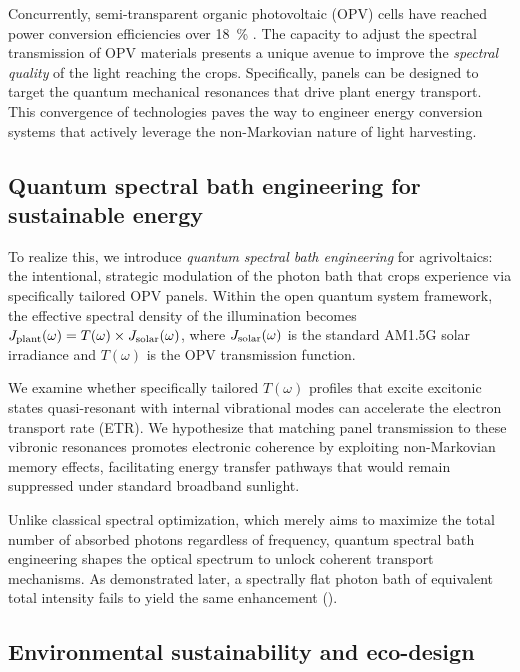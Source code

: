 Concurrently, semi-transparent organic photovoltaic (OPV) cells have reached power conversion efficiencies over \SI{18}{\percent} \cite{Lunt2011, Tong2016, Firdaus2019, Li2020, Cui2021, Wu2024}. The capacity to adjust the spectral transmission of OPV materials presents a unique avenue to improve the \textit{spectral quality} of the light reaching the crops. Specifically, panels can be designed to target the quantum mechanical resonances that drive plant energy transport. This convergence of technologies paves the way to engineer energy conversion systems that actively leverage the non-Markovian nature of light harvesting.

\subsection{Quantum spectral bath engineering for sustainable energy}

To realize this, we introduce \textit{quantum spectral bath engineering} for agrivoltaics: the intentional, strategic modulation of the photon bath that crops experience via specifically tailored OPV panels. Within the open quantum system framework, the effective spectral density of the illumination becomes $J_{\rm plant}(\omega) = T(\omega) \times J_{\rm solar}(\omega)$, where $J_{\rm solar}(\omega)$ is the standard AM1.5G solar irradiance and $T(\omega)$ is the OPV transmission function.

We examine whether specifically tailored $T(\omega)$ profiles that excite excitonic states quasi-resonant with internal vibrational modes can accelerate the electron transport rate (ETR). We hypothesize that matching panel transmission to these vibronic resonances promotes electronic coherence by exploiting non-Markovian memory effects, facilitating energy transfer pathways that would remain suppressed under standard broadband sunlight.

Unlike classical spectral optimization, which merely aims to maximize the total number of absorbed photons regardless of frequency, quantum spectral bath engineering shapes the optical spectrum to unlock coherent transport mechanisms. As demonstrated later, a spectrally flat photon bath of equivalent total intensity fails to yield the same enhancement ().

\subsection{Environmental sustainability and eco-design}

